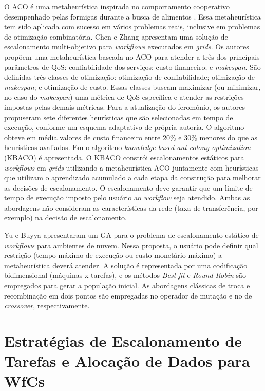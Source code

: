 O ACO é uma metaheurística inspirada no comportamento cooperativo desempenhado pelas formigas durante a busca de alimentos \cite{dorigo99}. Essa metaheurística tem sido aplicada com sucesso em vários problemas reais, inclusive em problemas de otimização combinatória. Chen e  Zhang \cite{Chen2009} apresentam uma solução de escalonamento multi-objetivo para \textit{workflows} executados em \textit{grids}. Os autores propõem uma metaheurística baseada no ACO para atender a três dos principais parâmetros de QoS: confiabilidade dos serviços; custo financeiro; e
\textit{makespan}. São definidas três classes de otimização: otimização de confiabilidade; otimização de \textit{makespan}; e otimização de custo. Essas classes buscam maximizar (ou minimizar, no caso do \textit{makespan}) uma métrica de QoS específica e atender as restrições impostas pelas demais métricas. Para a atualização do feromônio, os autores propuseram sete diferentes heurísticas que são selecionadas em tempo de execução, conforme um esquema adaptativo de própria autoria. O algoritmo obteve em média valores de custo financeiro entre 20\% e 30\% menores do que as heurísticas avaliadas. Em \cite{Hu2010}  o  algoritmo \textit{knowledge-based ant colony optimization} (KBACO) é apresentada. O KBACO constrói escalonamentos estáticos para \textit{workflows} em \textit{grids} utilizando a metaheurística ACO juntamente com heurísticas que utilizam o aprendizado acumulado a cada etapa da construção para melhorar as decisões de escalonamento. O escalonamento deve garantir que um limite de tempo de execução imposto pelo usuário ao \textit{workflow} seja atendido. Ambas as abordagens não consideram as características da rede (taxa de transferência, por exemplo) na decisão de escalonamento.  

Yu e Buyya \cite{Yu2006} apresentaram um GA para o problema de escalonamento estático de \textit{workflows} para ambientes de nuvem.
Nessa proposta, o usuário pode definir qual restrição (tempo máximo de execução ou custo monetário máximo) a metaheurística deverá atender. A solução é representada por uma codificação bidimensional (máquinas x tarefas), e os métodos \textit{Best-fit} e \textit{Round-Robin} são empregados para gerar a população inicial. As abordagens clássicas de  troca e recombinação em dois pontos são empregadas no operador de mutação e no de \textit{crossover}, respectivamente. 


\section{Estratégias de Escalonamento de Tarefas e Alocação de Dados para WfCs}\label{sec3:tds}

